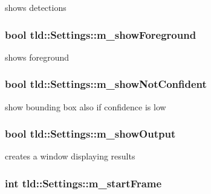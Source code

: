 shows detections 

\hypertarget{classtld_1_1_settings_ab2398d08ccb9bab01c3240651d07f8c3}{
\subsubsection[{m\_\-showForeground}]{\setlength{\rightskip}{0pt plus 5cm}bool {\bf tld::Settings::m\_\-showForeground}}}
\label{classtld_1_1_settings_ab2398d08ccb9bab01c3240651d07f8c3}


shows foreground 

\hypertarget{classtld_1_1_settings_acd69b3d8edc2fe3a05bb763dfd17b30b}{
\subsubsection[{m\_\-showNotConfident}]{\setlength{\rightskip}{0pt plus 5cm}bool {\bf tld::Settings::m\_\-showNotConfident}}}
\label{classtld_1_1_settings_acd69b3d8edc2fe3a05bb763dfd17b30b}


show bounding box also if confidence is low 

\hypertarget{classtld_1_1_settings_abce1f9678efba0511db88545d97bb535}{
\subsubsection[{m\_\-showOutput}]{\setlength{\rightskip}{0pt plus 5cm}bool {\bf tld::Settings::m\_\-showOutput}}}
\label{classtld_1_1_settings_abce1f9678efba0511db88545d97bb535}


creates a window displaying results 

\hypertarget{classtld_1_1_settings_ac63c6dfae7c0be1fc167608dd52e1d7f}{
\subsubsection[{m\_\-startFrame}]{\setlength{\rightskip}{0pt plus 5cm}int {\bf tld::Settings::m\_\-startFrame}}}
\label{classtld_1_1_settings_ac63c6dfae7c0be1fc167608dd52e1d7f}


